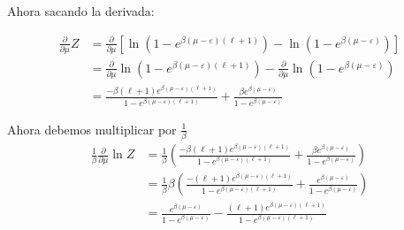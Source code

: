 \documentclass{report}
\begin{document}
Ahora sacando la derivada:

\begin{align*}
  \frac{\partial}{\partial \mu} Z &= \frac{\partial}{\partial \mu}\left[\ln \left( 1 - e^{\beta (\mu - \varepsilon) (\ell + 1)}\right) - \ln \left(1 - e^{\beta(\mu - \varepsilon)} \right)\right]\\
  &= \frac{\partial}{\partial \mu}\ln \left( 1 - e^{\beta (\mu - \varepsilon) (\ell + 1)}\right) - \frac{\partial}{\partial \mu}\ln \left(1 - e^{\beta(\mu - \varepsilon)} \right)\\
  &= \frac{- \beta (\ell + 1) e^{\beta (\mu - \varepsilon) (\ell + 1)}}{1 - e^{\beta (\mu - \varepsilon) (\ell + 1)}} + \frac{\beta e^{\beta(\mu - \varepsilon)}}{1 - e^{\beta(\mu - \varepsilon)}}
\end{align*}

Ahora debemos multiplicar por $\frac{1}{\beta}$
\begin{align*}
  \frac{1}{\beta}\frac{\partial}{\partial\mu} \ln Z &= \frac{1}{\beta}\left(\frac{- \beta (\ell + 1) e^{\beta (\mu - \varepsilon) (\ell + 1)}}{1 - e^{\beta (\mu - \varepsilon) (\ell + 1)}} + \frac{\beta e^{\beta(\mu - \varepsilon)}}{1 - e^{\beta(\mu - \varepsilon)}}\right)\\
  &= \frac{1}{\beta}\beta\left(\frac{- (\ell + 1) e^{\beta (\mu - \varepsilon) (\ell + 1)}}{1 - e^{\beta (\mu - \varepsilon) (\ell + 1)}} + \frac{ e^{\beta(\mu - \varepsilon)}}{1 - e^{\beta(\mu - \varepsilon)}}\right)\\
  &= \frac{ e^{\beta(\mu - \varepsilon)}}{1 - e^{\beta(\mu - \varepsilon)}} - \frac{(\ell + 1) e^{\beta (\mu - \varepsilon) (\ell + 1)}}{1 - e^{\beta (\mu - \varepsilon) (\ell + 1)}}\\
\end{align*}
\end{document}
